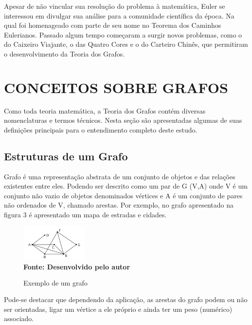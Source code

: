 Apesar de não vincular sua resolução do problema à matemática, Euler se interessou em divulgar sua análise para a comunidade científica da época. Na qual foi homenageado com parte de seu nome no Teorema dos Caminhos Eulerianos. Passado algum tempo começaram a surgir novos problemas, como o do Caixeiro Viajante, o das Quatro Cores e o do Carteiro Chinês, que permitiram o desenvolvimento da Teoria dos Grafos.

\section{\esp CONCEITOS SOBRE GRAFOS}

Como toda teoria matemática, a Teoria dos Grafos contém diversas nomenclaturas e termos técnicos. Nesta seção são apresentadas algumas de suas definições principais para o entendimento completo deste estudo.

\subsection{\esp Estruturas de um Grafo}

Grafo é uma representação abstrata de um conjunto de objetos e das relações existentes entre eles. Podendo ser descrito como um par de G (V,A) onde V é um conjunto não vazio de objetos denominados vértices e A é um conjunto de pares não ordenados de V, chamado arestas. Por exemplo, no grafo apresentado na figura 3 é apresentado um mapa de estradas e cidades.

\begin{figure}[ht]
	\centering	
	\caption[\hspace{0.1cm}Exemplo de um grafo.]{Exemplo de um grafo}
	\vspace{-0.4cm}
	\includegraphics[width=0.3\textwidth]{figuras/exemplo-grafo.png}
	 \vspace{-0.2cm}
	\\\textbf{\footnotesize Fonte: Desenvolvido pelo autor}
	\label{fig:figura1}
\end{figure}

Pode-se destacar que dependendo da aplicação, as arestas do grafo podem ou não ser orientadas, ligar um vértice a ele próprio e ainda ter um peso (numérico) associado.

